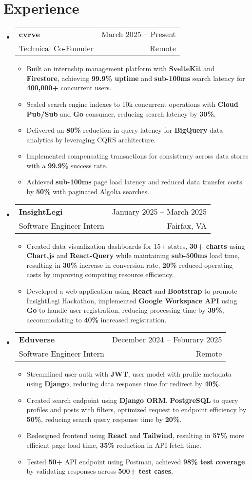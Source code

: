 \documentclass[letterpaper,11pt]{article}
\makeatletter
\newcommand{\resumeItem}[1]{
  \item\small{
    {#1 \vspace{0pt}}
  }
}
\newcommand{\resumeSubheading}[4]{
    \item
    \begin{tabular*}{0.985\textwidth}[t]{l@{\extracolsep{\fill}}r@{\hspace{-0.1in}}}
        \small{\textbf{#1}} & \small{#2} \\
        \small#3 & \small #4 \\
    \end{tabular*}\vspace{-5pt}
}
\newcommand{\resumeSubHeadingListStart}{\begin{itemize}[leftmargin=0.00in, rightmargin=-0.2in, label={}]\vspace{1pt}}
\newcommand{\resumeSubHeadingListEnd}{\end{itemize}\vspace{-7pt}}
\newcommand{\resumeItemListStart}{\begin{itemize}[leftmargin=0.15in, rightmargin=0.15in]}
\newcommand{\resumeItemListEnd}{\end{itemize}\vspace{-7pt}}
\makeatother
\begin{document}

\section{Experience}

\resumeSubHeadingListStart
\resumeSubheading
{cvrve} {March 2025 -- Present}
{Technical Co-Founder} {Remote}
\resumeItemListStart 
\resumeItem{Built an internship management platform with \textbf{SvelteKit} and \textbf{Firestore}, achieving \textbf{99.9\% uptime} and \textbf{sub-100ms} search latency for \textbf{400,000+} concurrent users.}
\resumeItem{Scaled search engine indexes to 10k concurrent operations with \textbf{Cloud Pub/Sub} and \textbf{Go} consumer, reducing search latency by \textbf{30\%}.}
\resumeItem{Delivered an \textbf{80\%} reduction in query latency for \textbf{BigQuery} data analytics by leveraging CQRS architecture.}
\resumeItem{Implemented compensating transactions for consistency across data stores with a \textbf{99.9\%} success rate.}
\resumeItem{Achieved \textbf{sub-100ms} page load latency and reduced data transfer costs by \textbf{50\%} with paginated Algolia searches.}
\resumeItemListEnd
\resumeSubHeadingListEnd

\resumeSubHeadingListStart
\resumeSubheading
{InsightLegi} {January 2025 -- March 2025}
{Software Engineer Intern} {Fairfax, VA}
\resumeItemListStart 
\resumeItem{Created data visualization dashboards for 15+ states, \textbf{30+ charts} using \textbf{Chart.js} and \textbf{React-Query} while maintaining \textbf{sub-500ms} load time, resulting in \textbf{30\%} increase in conversion rate, \textbf{20\%} reduced operating costs by improving computing resource efficiency.}
\resumeItem{Developed a web application using \textbf{React} and \textbf{Bootstrap} to promote InsightLegi Hackathon, implemented \textbf{Google Workspace API} using \textbf{Go} to handle user registration, reducing processing time by \textbf{39\%}, accommodating to \textbf{40\%} increased registration.}
\resumeItemListEnd
\resumeSubHeadingListEnd

\resumeSubHeadingListStart
\resumeSubheading
{Eduverse} {December 2024 -- Feburary 2025}
{Software Engineer Intern} {Remote}
\resumeItemListStart
\resumeItem{Streamlined user auth with \textbf{JWT}, user model with profile metadata using \textbf{Django}, reducing data response time for redirect by \textbf{40\%}.}
\resumeItem{Created search endpoint using \textbf{Django ORM}, \textbf{PostgreSQL} to query profiles and posts with filters, optimized request to endpoint efficiency by \textbf{50\%}, reducing search query response time by \textbf{20\%}.}
\resumeItem{Redesigned frontend using \textbf{React} and \textbf{Tailwind}, resulting in \textbf{57\%} more efficient page load time, \textbf{35\%} reduction in API fetch time.}
\resumeItem{Tested \textbf{50+} API endpoint using Postman, achieved \textbf{98\% test coverage} by validating responses across \textbf{500+ test cases}.}
\resumeItemListEnd
\resumeSubHeadingListEnd
\end{document}
